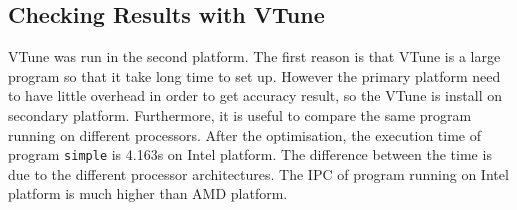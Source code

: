 \documentclass[conference]{IEEEtran}
\begin{document}
\subsection{Checking Results with VTune}

VTune was run in the second platform. The first reason is that VTune is a large program so that it take long time to set up. However the primary platform need to have little overhead in order to get accuracy result, so the VTune is install on secondary platform. Furthermore, it is useful to compare the same program running on different processors. After the optimisation, the execution time of program \texttt{simple} is 4.163s on Intel platform. The difference between the time is due to the different processor architectures. The IPC of program running on Intel platform is much higher than AMD platform. 
\end{document}
